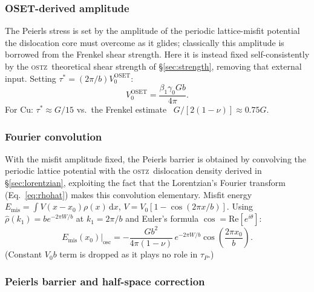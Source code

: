 \documentclass[3p]{elsarticle}
\newcommand{\OSTZ}{\textsc{ostz}}
\newcommand{\gz}{\gamma_0}
\begin{document}
\subsubsection{OSET-derived amplitude}

The Peierls stress is set by the amplitude of the periodic
lattice-misfit potential the dislocation core must overcome as it
glides; classically this amplitude is borrowed from the Frenkel
shear strength. Here it is instead fixed self-consistently by the
\OSTZ\ theoretical shear strength of \S\ref{sec:strength}, removing
that external input. Setting $\tau^*=(2\pi/b)V_0^\text{OSET}$:
\begin{equation}
  V_0^\text{OSET}=\frac{\beta_1\gz Gb}{4\pi}.
  \label{eq:V0OSET}
\end{equation}
For Cu: $\tau^*\approx G/15$ vs.\ the Frenkel estimate~\citep{frenkel1926} $G/[2(1-\nu)]\approx0.75G$.

\subsubsection{Fourier convolution}

With the misfit amplitude fixed, the Peierls barrier is obtained by
convolving the periodic lattice potential with the \OSTZ\ dislocation
density derived in \S\ref{sec:lorentzian}, exploiting the fact that
the Lorentzian's Fourier transform (Eq.~\eqref{eq:rhohat}) makes this
convolution elementary.
Misfit energy $E_\text{mis}=\int V(x-x_0)\rho(x)\,\mathrm dx$,
$V=V_0[1-\cos(2\pi x/b)]$.
Using $\hat\rho(k_1)=be^{-2\pi W/b}$ at $k_1=2\pi/b$
and Euler's formula $\cos=\mathrm{Re}[e^{i\theta}]$:
\begin{equation}
  E_\text{mis}(x_0)\big|_\text{osc}=
  -\frac{Gb^2}{4\pi(1-\nu)}\,e^{-2\pi W/b}
  \cos\!\left(\frac{2\pi x_0}{b}\right).
  \label{eq:Emisfit}
\end{equation}
(Constant $V_0 b$ term is dropped as it plays no role in $\tau_P$.)

\subsubsection{Peierls barrier and half-space correction}
\end{document}
